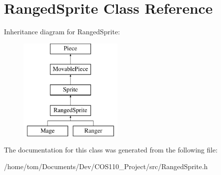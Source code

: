 \hypertarget{classRangedSprite}{\section{Ranged\-Sprite Class Reference}
\label{classRangedSprite}
}
Inheritance diagram for Ranged\-Sprite\-:\begin{figure}[H]
\begin{center}
\leavevmode
\includegraphics[height=5.000000cm]{classRangedSprite}
\end{center}
\end{figure}


The documentation for this class was generated from the following file\-:\begin{DoxyCompactItemize}
\item 
/home/tom/\-Documents/\-Dev/\-C\-O\-S110\-\_\-\-Project/src/Ranged\-Sprite.\-h\end{DoxyCompactItemize}
